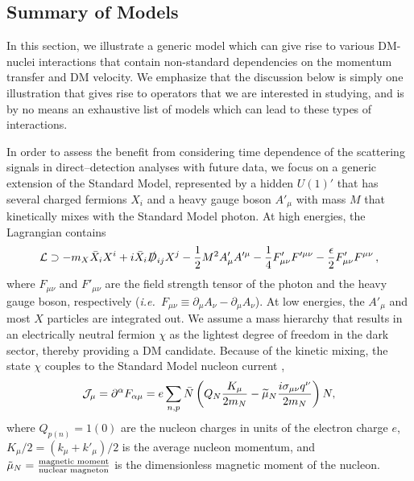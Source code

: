 \documentclass[11pt]{article}
\newcommand{\ie}{{\it i.e.~}}  \newcommand{\eg}{{\it e.g.~}}
\newcommand{\pL}{\left(} \newcommand{\pR}{\right)} \newcommand{\bL}{\left[} \newcommand{\bR}{\right]} \newcommand{\cbL}{\left\{} \newcommand{\cbR}{\right\}} \newcommand{\mL}{\left|} \newcommand{\mR}{\right|} \newcommand{\ER}{E_R}
\newcommand{\beq}{\begin{equation}} \newcommand{\eeq}{\end{equation}}
\begin{document}
\subsection{Summary of Models}\label{sec:models}
In this section, we illustrate a generic model which can give rise to various DM-nuclei interactions that contain non-standard dependencies on the momentum transfer and DM velocity. We emphasize that the discussion below is simply one illustration that gives rise to operators that we are interested in studying, and is by no means an exhaustive list of models which can lead to these types of interactions.

In order to assess the benefit from considering time dependence of the scattering signals in direct--detection analyses with future data, we focus on a generic extension of the Standard Model, represented by a hidden $U(1)'$ that has several charged fermions $X_i$ and a heavy gauge boson $A'_\mu$ with mass $M$ that kinetically mixes with the Standard Model photon. At high energies, the Lagrangian contains
\beq \label{eq:UV-model}
\cL \supset -  m_X \bar X_i X^i + i \bar X_i \slashed D_{ij} X^j  - \frac12 M^2 A'_\mu A'^\mu  - \frac14 F'_{\mu \nu} F'^{\mu \nu} - \frac\epsilon2 F'_{\mu \nu} F^{\mu \nu} \, ,
\eeq
where $F_{\mu \nu}$ and $F'_{\mu \nu}$ are the field strength tensor of the photon and the heavy gauge boson, respectively (\ie $F_{\mu \nu} \equiv \partial_\mu A_\nu - \partial_\mu A_\nu$). At low energies, the $A'_\mu$ and most $X$ particles are integrated out. We assume a mass hierarchy that results in an electrically neutral fermion $\chi$ as the lightest degree of freedom in the dark sector, thereby providing a DM candidate. Because of the kinetic mixing, the state $\chi$ couples to the Standard Model nucleon current \cite{Gresham:2014vja},
\beq \label{eq:current}
\cJ_\mu = \partial^\alpha F_{\alpha \mu} = e \sum_{n,p} \bar N \pL Q_N \frac{K_\mu}{2m_N} -\widetilde \mu_N \frac{i \sigma_{\mu \nu}q^\nu}{2m_N} \pR N,
\eeq 
where $Q_{p(n)}=1(0)$ are the nucleon charges in units of the electron charge $e$, $K_\mu/2 = (k_\mu + k'_\mu)/2$ is the average nucleon momentum, and $\tilde{\mu}_N = {\text{magnetic moment} \over \text{nuclear magneton}}$ is the dimensionless magnetic moment of the nucleon.
\end{document}
